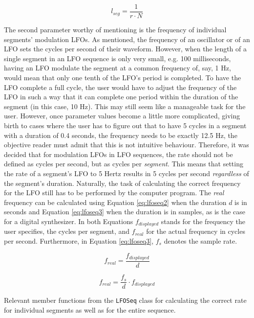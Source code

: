 \documentclass[12pt,twoside]{report}
\begin{document}
\begin{equation}
  l_{seg} = \frac{1}{r \cdot N}
  \label{eq:lfoseq1}
\end{equation}

\noindent The second parameter worthy of mentioning is the frequency of individual segments' modulation LFOs. As mentioned, the frequency of an oscillator or of an LFO sets the cycles per second of their waveform. However, when the length of a single segment in an LFO sequence is only very small, e.g. 100 milliseconds, having an LFO modulate the segment at a common frequency of, say, 1 Hz, would mean that only one tenth of the LFO's period is completed. To have the LFO complete a full cycle, the user would have to adjust the frequency of the LFO in such a way that it can complete one period within the duration of the segment (in this case, 10 Hz). This may still seem like a manageable task for the user. However, once parameter values become a little more complicated, giving birth to cases where the user has to figure out that to have 5 cycles in a segment with a duration of 0.4 seconds, the frequency needs to be exactly 12.5 Hz, the objective reader must admit that this is not intuitive behaviour. Therefore, it was decided that for modulation LFOs in LFO sequences, the rate should not be defined as cycles per second, but as cycles per \emph{segment}. This means that setting the rate of a segment's LFO to 5 Hertz results in 5 cycles per second \emph{regardless} of the segment's duration. Naturally, the task of calculating the correct frequency for the LFO still has to be performed by the computer program. The \emph{real} frequency can be calculated using Equation \ref{eq:lfoseq2} when the duration $d$ is in seconds and Equation \ref{eq:lfoseq3} when the duration is in samples, as is the case for a digital synthesizer. In both Equations $f_{displayed}$ stands for the frequency the user specifies, the cycles per segment, and $f_{real}$ for the actual frequency in cycles per second. Furthermore, in Equation \ref{eq:lfoseq3}, $f_{s}$ denotes the sample rate.

\begin{equation}
  f_{real} = \frac{f_{displayed}}{d}
  \label{eq:lfoseq2}
\end{equation}

\begin{equation}
  f_{real} = \frac{f_{s}}{d} \cdot f_{displayed}
  \label{eq:lfoseq3}
\end{equation}

\begin{table}[t!]
  \caption{Relevant member functions from the \texttt{LFOSeq} class for calculating the correct rate for individual segments as well as for the entire sequence.}
  \label{code:lfoseq}
\end{table}
\end{document}
